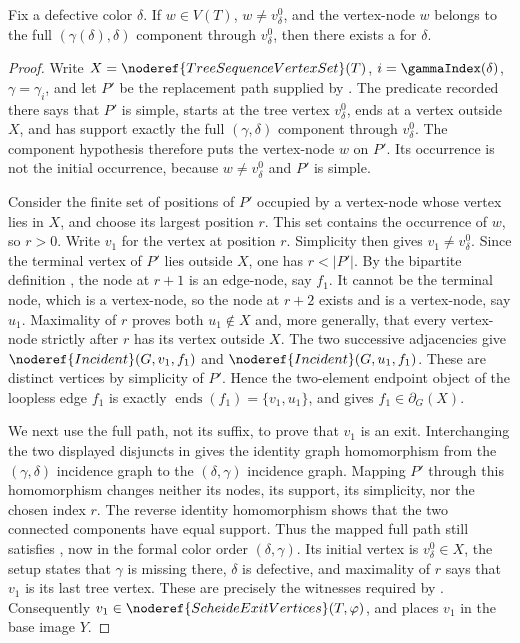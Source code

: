 \begin{helper}
Fix a defective color $\delta$.  If $w\in V(T)$, $w\ne v^0_\delta$, and
the vertex-node $w$ belongs to the full
$(\gamma(\delta),\delta)$ component through $v^0_\delta$, then there
exists a  for $\delta$.
\end{helper}
\begin{proof}
Write $X=\noderef{TreeSequenceVertexSet}(T)$,
$i=\gammaIndex(\delta)$, $\gamma=\gamma_i$, and let $P'$ be the
replacement path supplied by .  The
predicate  recorded there says that
$P'$ is simple, starts at the tree vertex $v^0_\delta$, ends at a vertex
outside $X$, and has support exactly the full
$(\gamma,\delta)$ component through $v^0_\delta$.  The component
hypothesis therefore puts the vertex-node $w$ on $P'$.  Its occurrence
is not the initial occurrence, because $w\ne v^0_\delta$ and $P'$ is
simple.

Consider the finite set of positions of $P'$ occupied by a vertex-node
whose vertex lies in $X$, and choose its largest position $r$.  This set
contains the occurrence of $w$, so $r>0$.  Write $v_1$ for the vertex at
position $r$.  Simplicity then gives $v_1\ne v^0_\delta$.  Since the
terminal vertex of $P'$ lies outside $X$, one has $r<|P'|$.  By the
bipartite definition , the node at
$r+1$ is an edge-node, say $f_1$.  It cannot be the terminal node, which
is a vertex-node, so the node at $r+2$ exists and is a vertex-node, say
$u_1$.  Maximality of $r$ proves both $u_1\notin X$ and, more generally,
that every vertex-node strictly after $r$ has its vertex outside $X$.
The two successive adjacencies give
$\noderef{Incident}(G,v_1,f_1)$ and
$\noderef{Incident}(G,u_1,f_1)$.  These are distinct vertices by
simplicity of $P'$.  Hence the two-element endpoint object of the
loopless edge $f_1$ is exactly
$\operatorname{ends}(f_1)=\{v_1,u_1\}$, and
 gives $f_1\in\partial_G(X)$.

We next use the full path, not its suffix, to prove that $v_1$ is an
exit.  Interchanging the two displayed disjuncts in
 gives the identity graph homomorphism
from the $(\gamma,\delta)$ incidence graph to the
$(\delta,\gamma)$ incidence graph.  Mapping $P'$ through this
homomorphism changes neither its nodes, its support, its simplicity, nor
the chosen index $r$.  The reverse identity homomorphism shows that the
two connected components have equal support.  Thus the mapped full path
still satisfies , now in the formal
color order $(\delta,\gamma)$.  Its initial vertex is
$v^0_\delta\in X$, the setup states that $\gamma$ is missing there,
$\delta$ is defective, and maximality of $r$ says that $v_1$ is its last
tree vertex.  These are precisely the witnesses required by
.  Consequently
$v_1\in\noderef{ScheideExitVertices}(T,\varphi)$, and
 places $v_1$ in the base image
$Y$.


\end{proof}
